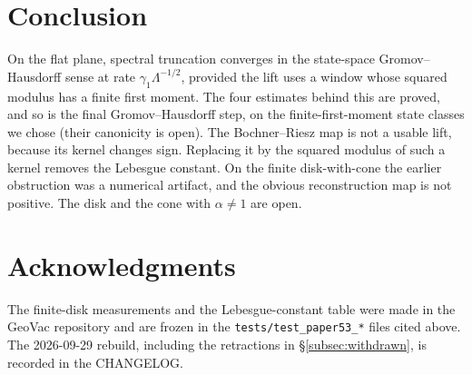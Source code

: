 \documentclass[11pt,a4paper]{article}
\theoremstyle{plain}
\theoremstyle{definition}
\begin{document}
\section{Conclusion}
On the flat plane, spectral truncation converges in the state-space
Gromov--Hausdorff sense at rate $\gamma_{1}\Lambda^{-1/2}$, provided the
lift uses a window whose squared modulus has a finite first moment. The
four estimates behind this are proved, and so is the final
Gromov--Hausdorff step, on the finite-first-moment state classes we chose
(their canonicity is open). The
Bochner--Riesz map is not a usable lift, because its kernel changes sign.
Replacing it by the squared modulus of such a kernel removes the
Lebesgue constant. On the finite disk-with-cone the earlier
obstruction was a numerical artifact, and the obvious reconstruction map
is not positive. The disk and the cone with $\alpha\ne1$ are open.

\section*{Acknowledgments}
The finite-disk measurements and the Lebesgue-constant table were made in
the GeoVac repository and are frozen in the \texttt{tests/test\_paper53\_*}
files cited above. The 2026-09-29 rebuild, including the retractions in
\S\ref{subsec:withdrawn}, is recorded in the CHANGELOG.
\end{document}
